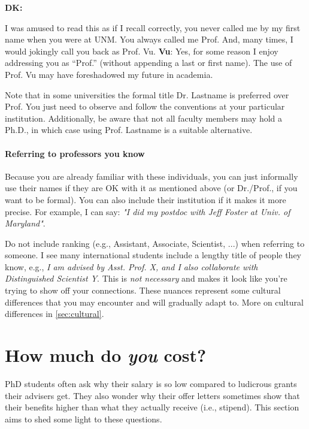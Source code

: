 \documentclass[oneside,11pt]{memoir}
\newenvironment{commentbox}[1][]{
  \small
  \begin{mybox}
    {\small \textbf{#1}}
  }{
  \end{mybox}
}
\begin{document}
\begin{commentbox}[DK:]
  I was amused to read this as if I recall correctly, you never called me by my first name when you were at UNM. You always called me Prof. And, many times, I would jokingly call you back as Prof. Vu.
  \tcblower
  \textbf{Vu}: Yes, for some reason I enjoy addressing you as ``Prof.'' (without appending a last or first name).  The use of Prof. Vu may have foreshadowed my future in academia.
\end{commentbox}

Note that in some universities the formal title Dr. Lastname is preferred over Prof. You just need to observe and follow the conventions at your particular institution. Additionally, be aware that not all faculty members may hold a Ph.D., in which case using Prof. Lastname is a suitable alternative.


\paragraph{Referring to professors you know} Because you are already familiar with these individuals, you can just informally use their names if they are OK with it as mentioned above (or Dr./Prof., if you want to be formal). You can also include their institution if it makes it more precise.  For example, I can say:  \emph{"I did my postdoc with Jeff Foster at Univ. of Maryland"}.   

Do not include ranking (e.g., Assistant, Associate, Scientist, ...) when referring to someone. I see many international students include a lengthy title of people they know, e.g., \emph{I am advised by Asst. Prof. X, and I also collaborate with Distinguished Scientist Y}.  This is \emph{not necessary} and makes it look like you're trying to show off your connections. These nuances represent some cultural differences that you may encounter and will gradually adapt to. More on cultural differences in \autoref{sec:cultural}.

\section{How much do \emph{you} cost?}\label{sec:ra-cost}
PhD students often ask why their salary is so low compared to ludicrous grants their advisers get. They also wonder why their offer letters sometimes show that their benefits higher than what they actually receive (i.e., stipend).  This section aims to shed some light to these questions.
\end{document}

